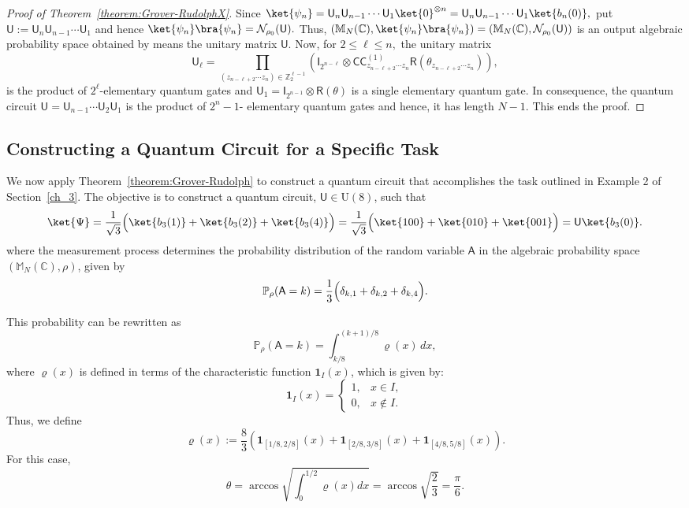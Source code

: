 \documentclass[a4paper,11pt]{article}
\newcommand{\rI}{\mathsf{I}}
\newcommand{\rR}{\mathsf{R}}
\newcommand{\rU}{\mathsf{U}}
\newcommand{\rA}{\mathsf{A}}
\newcommand{\rC}{\mathsf{C}}
\begin{document}
\begin{proof}[Proof of Theorem~\ref{theorem:Grover-RudolphX}]
Since $\ket{\psi_n}=\rU_n \rU_{n-1} \cdots \rU_1 \ket{0}^{\otimes n} = \rU_n \rU_{n-1} \cdots \rU_1 \ket{b_n(0)},$ put $\rU:= \rU_n \rU_{n-1} \cdots \rU_1$ and hence 
$\ket{\psi_n}\bra{\psi_n} = \mathcal{N}_{\rho_0}(\rU).$ Thus,
$(\mathbb{M}_N(\mathbb{C}),\ket{\psi_n}\bra{\psi_n}) = (\mathbb{M}_N(\mathbb{C}), \mathcal{N}_{\rho_0}(\rU))$
is an output algebraic probability space obtained by means the unitary matrix $\rU.$ 
Now, for $2 \le \ell \le n,$  the unitary matrix
$$
\rU_{\ell} = \prod_{(z_{n-\ell+2} \cdots z_n) \in \mathbb{Z}_{2}^{\ell-1}}(\rI_{2^{n-\ell}}\otimes \rC\rC^{(1)}_{z_{n-\ell+2}\cdots z_n}\rR(\theta_{z_{n-\ell+2} \cdots z_n})),
$$
is the product of $2^{\ell}$-elementary quantum gates and $\rU_1 = \rI_{2^{n-1}}\otimes \rR(\theta)$ is a single elementary quantum gate. In consequence, the quantum circuit $\rU=\rU_{n-1} \cdots \rU_2\rU_1$ is the product of $2^n-1$- elementary quantum gates and hence, it has length $N-1.$ This ends the proof.
\end{proof}


\subsection{Constructing a Quantum Circuit for a Specific Task}

We now apply Theorem~\ref{theorem:Grover-Rudolph} to construct a quantum circuit that accomplishes the task outlined in Example 2 of Section~\ref{ch_3}. The objective is to construct a quantum circuit, \(\rU \in \mathrm{U}(8)\), such that
\[
\ket{\Psi} = \frac{1}{\sqrt{3}} \Bigl(\ket{b_3(1)} + \ket{b_3(2)} + \ket{b_3(4)}\Bigr) = \frac{1}{\sqrt{3}}\Bigl(\ket{100} + \ket{010} + \ket{001}\Bigr) = \rU \ket{b_3(0)}.
\]
where the measurement process determines the probability distribution of the random variable \(\rA\) in the algebraic probability space \((\mathbb{M}_N(\mathbb{C}), \rho)\), given by
\[
\mathbb{P}_{\rho}(\rA = k) = \frac{1}{3}\Bigl(\delta_{k,1} + \delta_{k,2} + \delta_{k,4}\Bigr).
\]

This probability can be rewritten as
\[
\mathbb{P}_{\rho}(\rA = k) = \int_{k/8}^{(k+1)/8}  \varrho(x) \, dx,
\]
where \(\varrho(x)\) is defined in terms of the characteristic function  \(\mathbf{1}_{I}(x)\), which is given by:
\[
\mathbf{1}_{I}(x) =
\begin{cases}
1, & x \in I, \\
0, & x \notin I.
\end{cases}
\]
Thus, we define
\[
\varrho(x):= \frac{8}{3} \left(
 \mathbf{1}_{[1/8,2/8]}(x) + \mathbf{1}_{[2/8,3/8]}(x) + \mathbf{1}_{[4/8,5/8]}(x)\right).
\]
For this case,
\[
\theta = \arccos \sqrt{\int_{0}^{1/2} \varrho(x) dx} =  \arccos \sqrt{\frac{2}{3}} = \frac{\pi}{6}.
\]
\end{document}

